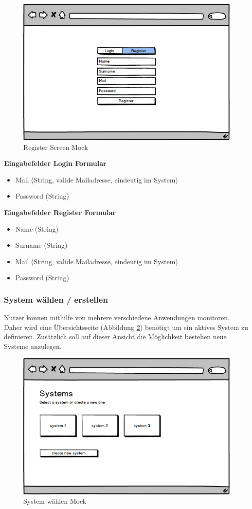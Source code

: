 \begin{figure}[h]
 \centering
 \includegraphics[width=0.7\linewidth]{kapitel1/mocks/Register.png}
 \caption{Register Screen Mock}
  \label{fig:register}
\end{figure}


\textbf{Eingabefelder Login Formular}
\begin{itemize}
\item Mail (String, valide Mailadresse, eindeutig im System)
\item Password (String)
\end{itemize}

\textbf{Eingabefelder Register Formular}
\begin{itemize}
\item Name (String)
\item Surname (String)
\item Mail (String, valide Mailadresse, eindeutig im System)
\item Password (String)
\end{itemize}



\subsubsection{System wählen / erstellen}

Nutzer können mithilfe von \projectname{} mehrere verschiedene Anwendungen monitoren.
Daher wird eine Übersichtsseite (Abbildung \ref{fig:system-picker}) benötigt
um ein aktives System zu definieren. Zusätzlich soll auf dieser Ansicht die Möglichkeit bestehen neue Systeme anzulegen.

\vspace{0.3cm}

\begin{figure}[h]
 \centering
 \includegraphics[width=0.6\linewidth]{kapitel1/mocks/system-picker.png}
 \caption{System wählen Mock}
 \label{fig:system-picker}
\end{figure}


